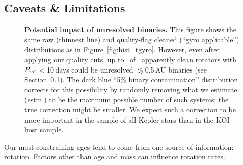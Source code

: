 \documentclass[11pt,twocolumn,tighten]{aastex63}
\begin{document}
\subsection{Caveats \& Limitations}
\label{subsec:caveats}


\begin{figure}[!t]
	\begin{center}
		\leavevmode
	\end{center}
	\vspace{-0.6cm}
	\caption{{\bf Potential impact of unresolved binaries.}   This figure shows
		the same raw (thinnest line) and quality-flag cleaned (``gyro applicable'') distributions
		as in Figure~\ref{fig:hist_tgyro}.
		However, even after applying our quality cuts, up to
		\fivepctnuniqstarsantosrotgyroappl\ of \ngyroappllttendays\ apparently clean rotators with
		$P_{\rm rot}$$<$10\,days could be unresolved $\lesssim$0.5\,AU  binaries (see Section~\ref{subsec:caveats}).
		The dark blue ``5\% binary contamination'' distribution corrects for this possibility by randomly removing
		what we estimate (estm.) to be the maximum possible number of such systems; the true
		correction might be smaller.  We expect such a correction to be more important in
		the sample of all Kepler stars than in the KOI host sample.
		\label{fig:hist_tgyro_corr}
	}
\end{figure}

Our most constraining ages tend to come from one source of
information: rotation.  Factors other than age and mass can
influence rotation rates.  
\end{document}
